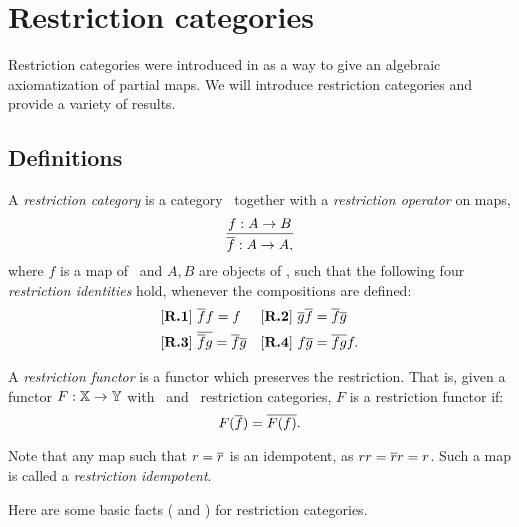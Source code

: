 
\chapter{Restriction categories} %
\label{chap:restriction_categories}


Restriction categories were introduced in
 \cite{cockett2002:restcategories1} as a way to give an algebraic axiomatization of partial maps.
We will introduce restriction categories and provide a variety of results.

\section{Definitions}
\label{sec:definitions}


\begin{definition}\label{def:restriction_category}
  A \emph{restriction category} is a category \X\ together with a \emph{restriction operator} on
  maps,
  \[
    \infer{\restr{f}:A\to A,}{f:A \to B}
  \]
  where $f$ is a map of \X\ and $A,B$ are objects of \X, such that the
  following four \emph{restriction identities} hold, whenever the
  compositions are defined:
  \begin{align*}
    &[\text{\bfseries {R}.{1}}]\ \overline{f} f = f & &
    [\text{\bfseries {R}.{2}}]\ \overline{g}  \overline{f} = \overline{f}  \overline{g}\\
    &[\text{\bfseries {R}.{3}}]\ \overline{\overline{f}  g} = \overline{f}   \overline{g} & &
    [\text{\bfseries {R}.{4}}]\  f \overline{g} = \overline{f g} f.
  \end{align*}
\end{definition}

\begin{definition}
  A \emph{restriction functor} is a functor which preserves the restriction. That is,
  given a functor $F: \mathbb{X} \to \mathbb{Y}$ with \X\  and \Y\ restriction categories,
  $F$ is a restriction functor if:
  \[
    F(\overline{f}) = \overline{F(f)}.
  \]
\end{definition}

Note that any map such that $r=\overline{r}$ is an idempotent, as $r r = \overline{r} r = r$.
Such a map is called a \emph{restriction idempotent}.

Here are some basic facts (\cite{cockett2002:restcategories1} and
\cite{cockett-manes09-boolean-classical-rest-cats}) for restriction categories.

